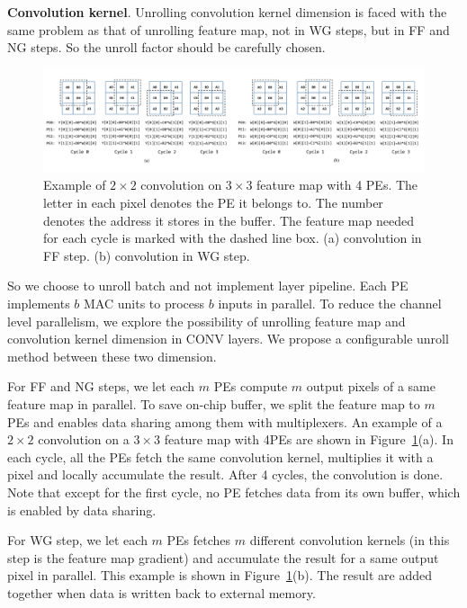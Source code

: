 {\bf{Convolution kernel}}. Unrolling convolution kernel dimension is faced with the same problem as that of unrolling feature map, not in WG steps, but in FF and NG steps. So the unroll factor should be carefully chosen.

\begin{figure}[t]
  \centering
  \includegraphics[width=2.0\columnwidth]{figures/mmap.pdf}
  \caption{Example of $2\times 2$ convolution on $3\times 3$ feature map with 4 PEs. The letter in each pixel denotes the PE it belongs to. The number denotes the address it stores in the buffer. The feature map needed for each cycle is marked with the dashed line box. (a) convolution in FF step. (b) convolution in WG step.}
  \label{fig:mmap}
\end{figure}

So we choose to unroll batch and not implement layer pipeline. Each PE implements $b$ MAC units to process $b$ inputs in parallel. To reduce the channel level parallelism, we explore the possibility of unrolling feature map and convolution kernel dimension in CONV layers. We propose a configurable unroll method between these two dimension. 

For FF and NG steps, we let each $m$ PEs compute $m$ output pixels of a same feature map in parallel. To save on-chip buffer, we split the feature map to $m$ PEs and enables data sharing among them with multiplexers. An example of a $2\times 2$ convolution on a $3\times 3$ feature map with 4PEs are shown in Figure~\ref{fig:mmap}(a). In each cycle, all the PEs fetch the same convolution kernel, multiplies it with a pixel and locally accumulate the result. After 4 cycles, the convolution is done. Note that except for the first cycle, no PE fetches data from its own buffer, which is enabled by data sharing.

For WG step, we let each $m$ PEs fetches $m$ different convolution kernels (in this step is the feature map gradient) and accumulate the result for a same output pixel in parallel. This example is shown in Figure~\ref{fig:mmap}(b). The result are added together when data is written back to external memory. 

